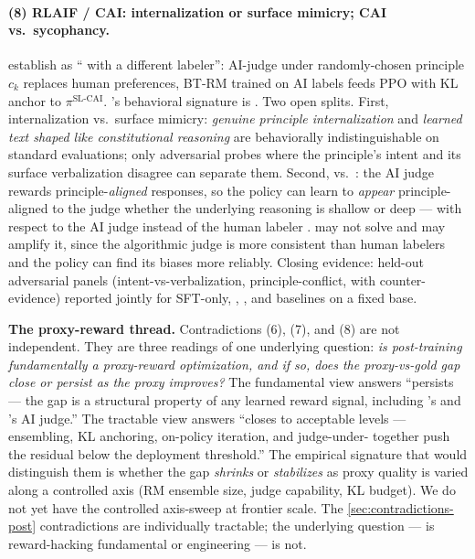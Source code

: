 \paragraph{(8) RLAIF / CAI: internalization or surface mimicry; CAI vs.\ sycophancy.}
\citet{bai2022-cai} establish  as `` with a different
labeler'': AI-judge under randomly-chosen principle $c_k$ replaces
human preferences, BT-RM trained on AI labels feeds PPO with KL
anchor to $\pi^{\text{SL-CAI}}$. 's behavioral signature is
. Two open splits. First, internalization vs.\ surface
mimicry: \emph{genuine principle internalization} and \emph{learned
text shaped like constitutional reasoning} are behaviorally
indistinguishable on standard evaluations; only adversarial probes
where the principle's intent and its surface verbalization disagree
can separate them. Second,  vs.\ : the AI judge rewards
principle-\emph{aligned} responses, so the policy can learn to
\emph{appear} principle-aligned to the judge whether the underlying
reasoning is shallow or deep ---  with respect to the AI
judge instead of the human labeler \citep{sharma2023-sycophancy}.
 may not solve  and may amplify it, since the
algorithmic judge is more consistent than human labelers and the
policy can find its biases more reliably. Closing evidence:
held-out adversarial  panels (intent-vs-verbalization,
principle-conflict,  with counter-evidence) reported
jointly for SFT-only, , , and  baselines on a fixed base.

\begin{contradiction}
\textbf{The proxy-reward thread.} Contradictions (6), (7), and (8)
are not independent. They are three readings of one underlying
question: \emph{is post-training fundamentally a proxy-reward
optimization, and if so, does the proxy-vs-gold gap close or persist
as the proxy improves?} The fundamental view answers ``persists ---
the gap is a structural property of any learned reward signal,
including 's  and 's AI judge.'' The tractable
view answers ``closes to acceptable levels --- ensembling,
KL anchoring, on-policy iteration, and judge-under-
together push the residual below the deployment threshold.'' The
empirical signature that would distinguish them is whether the gap
\emph{shrinks} or \emph{stabilizes} as proxy quality is varied along
a controlled axis (RM ensemble size, judge capability, KL budget).
We do not yet have the controlled axis-sweep at frontier scale. The
\cref{sec:contradictions-post} contradictions are individually
tractable; the underlying question --- is reward-hacking fundamental
or engineering --- is not.
\end{contradiction}

